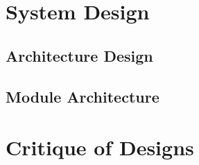 \section{System Design}
\label{design:system}

\subsection{Architecture Design}
\label{system:architecture-design}

\subsection{Module Architecture}
\label{system:module-architecture}

\section{Critique of Designs}
\label{design:critique}